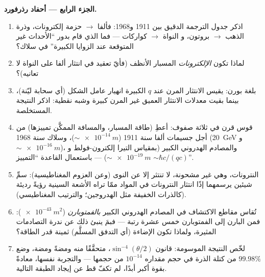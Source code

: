 \begin{problem}
\medskip\noindent\textbf{الجزء الرابع --- أحفاد رذرفورد.}
\begin{enumerate}[resume]
  \item اذكر جدول الترجمة الدقيق بين 1911 و1968:
        فألفا $\to$ حزمة إلكترونات، وذرة الذهب $\to$ بروتون، و
        النواة $\to$ كواركات --- فما الذي قام بدور
        ``الأحداث غير المتوقعة عند الزوايا الكبيرة'' في سلاك؟
  \item لماذا تكون \emph{الإلكترونات} المسبار الأنظف (فأيّ
        تعقيد في انتثار ألفا على النواة لا تعانيه)؟
  \item بلغة بورن: يقيس الانتثار المرن عند $q$ الكبيرة
        انهيار عامل الشكل (أي سحابة ليّنة)، بينما بقيت
        معدلات الانتثار العميق غير المرن كبيرة وشبه نقطية:
        اذكر النتيجة المستخلصة.
  \item قوس قرن في ثلاثة صفوف: أعطِ (طاقة المسبار، والمسافة
        الممكَّن تمييزها) من أجل جسيمات ألفا سنة 1911 ($\sim\qty{e-14}{m}$)،
        وسلاك سنة 1968 (\qty{20}{GeV} و $\sim\qty{e-16}{m}$)،
        والمصادم الهدروني الكبير (بمقياس التيرا إلكترون-فولط و $\sim\qty{e-19}{m}$) --- باستعمال
        القاعدة ``التمييز $\sim \hbar c/(qc)$''.
  \item النترونات، وهي غير مشحونة، لا تنتثر إلا عن النوى (وعن
        العزوم المغناطيسية): سمِّ شيئين يرسمهما إذًا انتثار
        النترونات في المواد ممّا تراه الأشعة السينية رؤيةً رديئة
        (كالذرات الخفيفة مثل الهدروجين؛ والترتيب المغناطيسي).
  \item تُقاس مقاطع الاكتشاف في المصادم الهدروني الكبير
        \emph{بالفمتوبارن} ($\qty{e-43}{m^2}$): فمن البارن إلى
        الفمتوبارن خمس عشرة رتبة --- فبمَ ينبئ ذلك
        عن ندرة التصادمات المثيرة، ولماذا تكون
        الإضاءة (أي التدفق المسلَّم) ثمينة قدر الطاقة؟
  \item لخّص النتيجة الموسومة: قانون $\sin^{-4}(\theta/2)$،
        متحقَّقًا منه ومضةً ومضة، وضع $99.98\%$ من كتلة الذرة
        في حجم مقداره $10^{-14}$ من حجمها --- والتجربة نفسها،
        معادةً بقوة أكبر أبدًا، لم تكفّ قط عن إيجاد الطبقة
        التالية.
\end{enumerate}
\end{problem}

